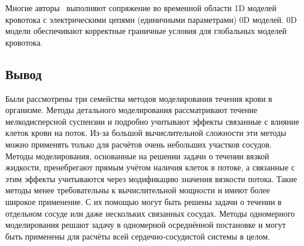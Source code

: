 Многие авторы~\cite{alastruey:2008} выполняют сопряжение во временной области 1D моделей кровотока с электрическими цепями
(единичными параметрами) 0D моделей. 0D модели обеспечивают корректные граничные условия для глобальных моделей кровотока.
\\
\subsection{Вывод}
Были рассмотрены три семейства методов моделирования течения крови в организме.
Методы детального моделирования рассматривают течение мелкодисперсной суспензии
и подробно учитывают эффекты связанные с влияние клеток крови на поток.
Из-за большой вычислительной сложности эти методы можно применять
только для расчётов очень небольших участков сосудов.
Методы моделирования, основанные на решении задачи о течении вязкой жидкости,
пренебрегают прямым учётом наличия клеток в потоке, а связанные с этим эффекты
учитываются через модификацию значения вязкости потока.
Такие методы менее требовательны к вычислительной мощности и имеют более широкое применение. С их помощью могут быть решены
задачи о течении в отдельном сосуде или даже нескольких связанных сосудах.
Методы одномерного моделирования решают задачу в одномерной осреднённой постановке и могут быть
применены для расчёты всей сердечно-сосудистой системы в целом.

